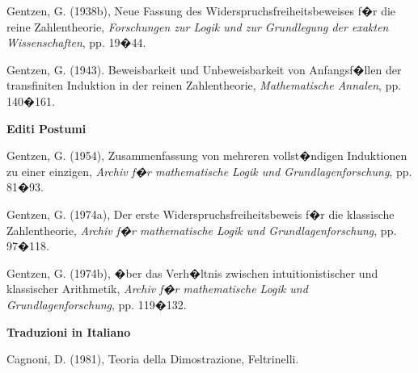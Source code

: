 \documentclass[a4paper,12pt]{aphex}
\begin{document}
\vspace{0.1cm}


Gentzen, G. (1938b), Neue Fassung des Widerspruchsfreiheitsbeweises f�r die reine Zahlentheorie, \emph{Forschungen zur Logik und zur Grundlegung der exakten Wissenschaften}, pp. 19�44. 

\vspace{0.1cm}


Gentzen, G. (1943). Beweisbarkeit und Unbeweisbarkeit von Anfangsf�llen der transfiniten Induktion in der reinen Zahlentheorie,  \emph{Mathematische Annalen}, pp. 140�161.


\vspace{0.3cm}

\noindent\textbf{Editi Postumi}


\vspace{0.3cm}



Gentzen, G. (1954), Zusammenfassung von mehreren vollst�ndigen Induktionen zu einer einzigen, \emph{Archiv f�r mathematische Logik und Grundlagenforschung}, pp.  81�93.

\vspace{0.1cm}


Gentzen, G. (1974a), Der erste Widerspruchsfreiheitsbeweis f�r die klassische Zahlentheorie,  \emph{Archiv f�r mathematische Logik und Grundlagenforschung},  pp. 97�118. 

\vspace{0.1cm}


Gentzen, G. (1974b), �ber das Verh�ltnis zwischen intuitionistischer und klassischer Arithmetik, \emph{Archiv f�r mathematische Logik und Grundlagenforschung}, pp.  119�132. 

\vspace{0.1cm}

\vspace{0.3cm}

\noindent\textbf{Traduzioni in Italiano}


\vspace{0.3cm}

Cagnoni, D. (1981), Teoria della Dimostrazione, Feltrinelli.  






\clearpage


\end{document}

